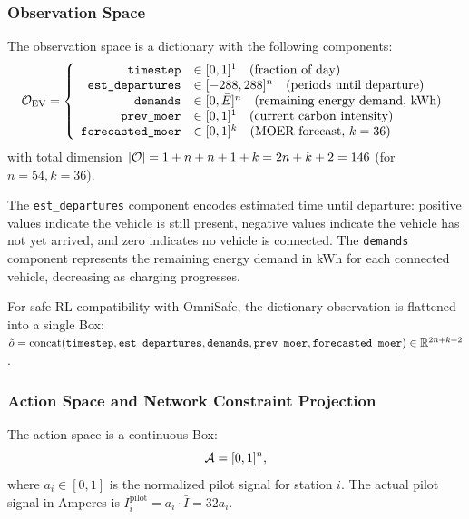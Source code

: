 \subsubsection{Observation Space}

The observation space is a dictionary with the following components:
\begin{equation}
    \mathcal{O}_{\text{EV}} = \left\{
    \begin{array}{rl}
    \texttt{timestep} & \in [0,1]^1 \quad \text{(fraction of day)} \\
    \texttt{est\_departures} & \in [-288, 288]^n \quad \text{(periods until departure)} \\
    \texttt{demands} & \in [0, \bar{E}]^n \quad \text{(remaining energy demand, kWh)} \\
    \texttt{prev\_moer} & \in [0,1]^1 \quad \text{(current carbon intensity)} \\
    \texttt{forecasted\_moer} & \in [0,1]^{k} \quad \text{(MOER forecast, } k = 36\text{)}
    \end{array}\right.
    \label{eq:ev_obs}
\end{equation}
with total dimension $|\mathcal{O}| = 1 + n + n + 1 + k = 2n + k + 2 = 146$ (for $n=54, k=36$).

The \texttt{est\_departures} component encodes estimated time until departure: positive values indicate the vehicle is still present, negative values indicate the vehicle has not yet arrived, and zero indicates no vehicle is connected. The \texttt{demands} component represents the remaining energy demand in kWh for each connected vehicle, decreasing as charging progresses.

For safe RL compatibility with OmniSafe, the dictionary observation is flattened into a single Box: $\tilde{o} = \text{concat}(\texttt{timestep}, \texttt{est\_departures}, \texttt{demands}, \texttt{prev\_moer}, \texttt{forecasted\_moer}) \in \mathbb{R}^{2n+k+2}$.

\subsubsection{Action Space and Network Constraint Projection}

The action space is a continuous Box:
\begin{equation}
    \mathcal{A} = [0, 1]^n,
\end{equation}
where $a_i \in [0, 1]$ is the normalized pilot signal for station $i$. The actual pilot signal in Amperes is $I_i^{\text{pilot}} = a_i \cdot \bar{I} = 32 a_i$.

